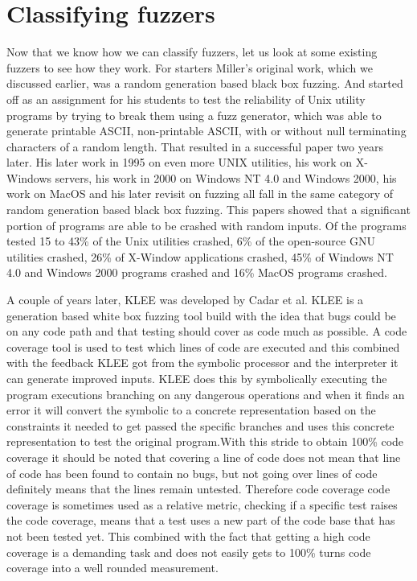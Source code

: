 \section{Classifying fuzzers}
\label{cha:2:OtherFuzzers}
Now that we know how we can classify fuzzers, let us look at some existing fuzzers to see how they work. For starters Miller's original work, which we discussed earlier, was a random generation based black box fuzzing. And started off as an assignment for his students to test the reliability of Unix utility programs by trying to break them using a fuzz generator, which was able to generate printable ASCII, non-printable ASCII, with or without null terminating characters of a random length. That resulted in a successful paper\cite{4originalFuzzingUnixUtils} two years later. His later work in 1995 on even more UNIX utilities, his work on X-Windows servers\cite{26miller1995fuzzrevisited}, his work in 2000 on Windows NT 4.0 and Windows 2000\cite{24MillerWindows}, his work on MacOS\cite{25MillerOnMacOS} and his later revisit\cite{3miller2020relevanceOfClasicalFuzzTesting} on fuzzing all fall in the same category of random generation based black box fuzzing. This papers showed that a significant portion of programs are able to be crashed with random inputs. Of the programs tested 15 to 43\% of the Unix utilities crashed, 6\% of the open-source GNU utilities crashed, 26\% of X-Window applications crashed, 45\% of Windows NT 4.0 and Windows 2000 programs crashed and 16\% MacOS programs crashed.

A couple of years later, KLEE\cite{8KLEE} was developed by Cadar et al. KLEE is a generation based white box fuzzing tool build with the idea that bugs could be on any code path and that testing should cover as code much as possible. A code coverage tool is used to test which lines of code are executed and this combined with the feedback KLEE got from the symbolic processor and the interpreter it can generate improved inputs. KLEE does this by symbolically executing the program executions branching on any dangerous operations and when it finds an error it will convert the symbolic to a concrete representation based on the constraints it needed to get passed the specific branches and uses this concrete representation to test the original program.With this stride to obtain 100\% code coverage it should be noted that covering a line of code does not mean that line of code has been found to contain no bugs, but not going over lines of code definitely means that the lines remain untested. Therefore code coverage code coverage is sometimes used as a relative metric, checking if a specific test raises the code coverage, means that a test uses a new part of the code base that has not been tested yet. This combined with the fact that getting a high code coverage is a demanding task and does not easily gets to 100\% turns code coverage into a well rounded measurement.

